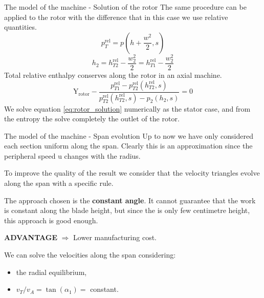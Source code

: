 \documentclass{beamer}
\newcommand{\myspace}[0]{\vspace{0.3cm}}
\newcommand{\myspaceneg}[0]{\vspace{-0.15cm}}
\newcommand{\highlightgreenC}[1]{\textcolor{chameleongreen3}{#1}}%
\begin{document}
\begin{frame}[t]{The model of the machine - Solution of the rotor}
The same procedure can be applied to the rotor with the difference that in this case we use relative quantities.
\myspaceneg
\begin{equation}
p_T^{\text{rel}} = p\left( h + \frac{w^2}{2}, s \right)
\end{equation}
\myspaceneg
\myspaceneg
\begin{equation}
h_{2} = h_{T2}^{\text{rel}} - \frac{w_2^2}{2} = h_{T1}^{\text{rel}} - \frac{w_2^2}{2}
\end{equation}
Total relative enthalpy conserves along the rotor in an axial machine.
\begin{equation}
\label{eq:rotor_solution}
\text{Y}_\text{rotor} - \dfrac{p_{T1}^{\text{rel}} - p_{T2}^{\text{rel}}(h_{T2}^{\text{rel}}, s)}{p_{T2}^{\text{rel}}(h_{T2}^{\text{rel}}, s) - p_2(h_{2}, s)} = 0
\end{equation}
We solve equation \ref{eq:rotor_solution} numerically as the stator case, and from the entropy the solve completely the outlet of the rotor.
\end{frame}


\begin{frame}[t]{The model of the machine - Span evolution}
Up to now we have only considered each section uniform along the span.
Clearly this is an approximation since the peripheral speed u changes with the radius.

To improve the quality of the result we consider that the velocity triangles evolve along the span with a specific rule.

The approach chosen is the \highlightgreenC{\textbf{constant angle}}. It cannot guarantee that the work is constant along the blade height, but since the is only few centimetre height, this approach is good enough. 

\myspace
\highlightgreenC{\textbf{ADVANTAGE}} $\Rightarrow$ Lower manufacturing cost.
\myspace

We can solve the velocities along the span considering:
\myspaceneg
\begin{itemize}
	\item the radial equilibrium,
	\item $v_T / v_A = \tan(\alpha_1) = $ constant.
\end{itemize}
\end{frame}
\end{document}
